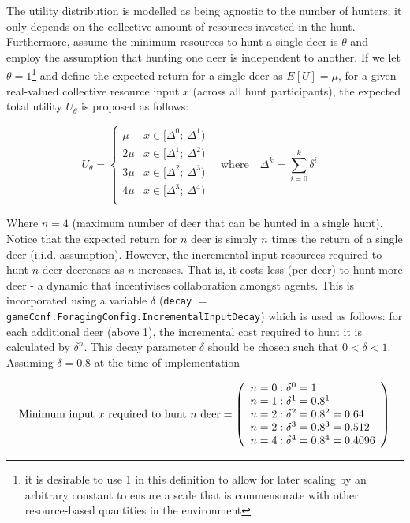 The utility distribution is modelled as being agnostic to the number of hunters; it only depends on the collective amount of resources invested in the hunt. Furthermore, assume the minimum resources to hunt a single deer is $\theta$ and employ the assumption that hunting one deer is independent to another. If we let $\theta=1$\footnote{it is desirable to use 1 in this definition to allow for later scaling by an arbitrary constant to ensure a scale that is commensurate with other resource-based quantities in the environment} and define the expected return for a single deer as $E[U]=\mu$, for a given real-valued collective resource input $x$ (across all hunt participants), the expected total utility $U_{\theta}$ is proposed as follows:

\begin{equation}
U_{\theta}=\left\{\begin{array}{ll}
\mu & x \in[\Delta^0; \ \Delta^1)\\
2 \mu & x\in[\Delta^1; \ \Delta^2)\\
3 \mu & x\in[\Delta^2; \ \Delta^3)\\
4 \mu & x\in[\Delta^3; \ \Delta^4)\\
\end{array}\right.  \quad \text{where} \quad \Delta^k= \sum_{i=0}^k\delta^i  \quad 
\end{equation}

Where $n=4$ (maximum number of deer that can be hunted in a single hunt). Notice that the expected return for $n$ deer is simply $n$ times the return of a single deer (i.i.d. assumption). However, the incremental input resources required to hunt $n$ deer decreases as $n$ increases. That is, it costs less (per deer) to hunt more deer - a dynamic that incentivises collaboration amongst agents. This is incorporated using a variable $\delta$ (\texttt{decay} $=$ \texttt{gameConf.ForagingConfig.IncrementalInputDecay}) which is used as follows: for each additional deer (above 1), the incremental cost required to hunt it is calculated by $\delta^n$. This decay parameter $\delta$ should be chosen such that $0< \delta< 1$. Assuming $\delta=0.8$ at the time of implementation 

\begin{equation}
\text{Minimum input $x$ required to hunt $n$ deer}=
\left( \begin{array}{ll@{}}
n=0: \delta^0 = 1 \\
n=1: \delta^1 = 0.8^1 \\
n=2: \delta^2 = 0.8^2 = 0.64 \\
n=2: \delta^3 = 0.8^3 = 0.512 \\
n=4: \delta^4 = 0.8^4 = 0.4096\\ 
\end{array} \right)
\end{equation}

